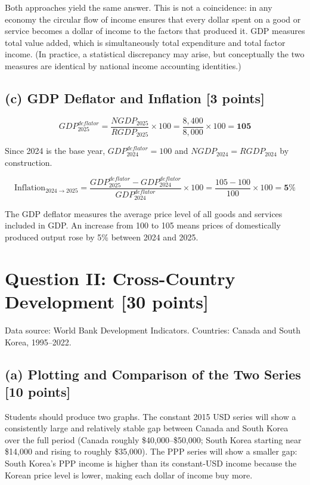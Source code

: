 \documentclass[letterpaper,12pt]{article}
\begin{document}
\noindent Both approaches yield the same answer. This is not a coincidence: in any economy the circular flow of income ensures that every dollar spent on a good or service becomes a dollar of income to the factors that produced it. GDP measures total value added, which is simultaneously total expenditure and total factor income. (In practice, a statistical discrepancy may arise, but conceptually the two measures are identical by national income accounting identities.)

\subsection*{(c) GDP Deflator and Inflation [3 points]}

\textcolor{sol}{
\[
GDP^{deflator}_{2025} = \frac{NGDP_{2025}}{RGDP_{2025}} \times 100 = \frac{8{,}400}{8{,}000} \times 100 = \mathbf{105}
\]
}

Since 2024 is the base year, $GDP^{deflator}_{2024} = 100$ and $NGDP_{2024} = RGDP_{2024}$ by construction.

\textcolor{sol}{
\[
\text{Inflation}_{2024 \to 2025} = \frac{GDP^{deflator}_{2025} - GDP^{deflator}_{2024}}{GDP^{deflator}_{2024}} \times 100 = \frac{105 - 100}{100} \times 100 = \mathbf{5\%}
\]
}

The GDP deflator measures the average price level of all goods and services included in GDP. An increase from 100 to 105 means prices of domestically produced output rose by 5\% between 2024 and 2025.


\section*{Question II: Cross-Country Development [30 points]}

\noindent Data source: World Bank Development Indicators. Countries: Canada and South Korea, 1995--2022.

\subsection*{(a) Plotting and Comparison of the Two Series [10 points]}

Students should produce two graphs. The constant 2015 USD series will show a consistently large and relatively stable gap between Canada and South Korea over the full period (Canada roughly \$40{,}000--\$50{,}000; South Korea starting near \$14{,}000 and rising to roughly \$35{,}000). The PPP series will show a smaller gap: South Korea's PPP income is higher than its constant-USD income because the Korean price level is lower, making each dollar of income buy more.
\end{document}

